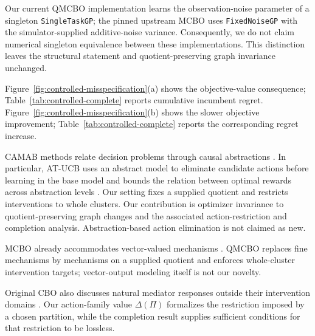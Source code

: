 Our current QMCBO implementation learns the observation-noise parameter
of a singleton \texttt{SingleTaskGP}; the pinned upstream MCBO uses
\texttt{FixedNoiseGP} with the simulator-supplied additive-noise variance.
Consequently, we do not claim numerical singleton equivalence between
these implementations. This distinction leaves the structural statement
and quotient-preserving graph invariance unchanged.

Figure~\ref{fig:controlled-misspecification}(a) shows the objective-value
consequence; Table~\ref{tab:controlled-complete} reports cumulative
incumbent regret.
Figure~\ref{fig:controlled-misspecification}(b) shows the slower objective
improvement; Table~\ref{tab:controlled-complete} reports the corresponding
regret increase.

CAMAB methods relate decision problems through causal abstractions
\cite{zennaro2024camab,dyer2025atucb}. In particular, AT-UCB uses an
abstract model to eliminate candidate actions before learning in the base
model and bounds the relation between optimal rewards across abstraction
levels \cite{dyer2025atucb}. Our setting fixes a supplied quotient and
restricts interventions to whole clusters. Our contribution is optimizer
invariance to quotient-preserving graph changes and the associated
action-restriction and completion analysis. Abstraction-based action
elimination is not claimed as new.

MCBO already accommodates vector-valued mechanisms
\cite{sussex2023mcbo}. QMCBO replaces fine mechanisms by mechanisms on a
supplied quotient and enforces whole-cluster intervention targets;
vector-output modeling itself is not our novelty.

Original CBO also discusses natural mediator responses outside their
intervention domains \cite{aglietti2020cbo}. Our action-family value
$\Delta(\Pi)$ formalizes the restriction imposed by a chosen partition,
while the completion result supplies sufficient conditions for that
restriction to be lossless.
